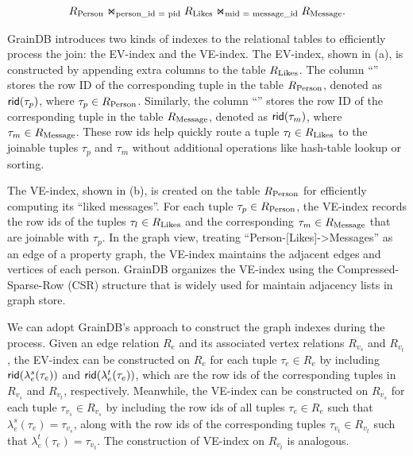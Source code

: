 \[ {R_{\text{Person}}} \Join_\text{person\_id = pid} {\ensuremath R_{\text{Likes}}} \Join_\text{mid = message\_id} {\ensuremath R_{\text{Message}}}. \]

GrainDB introduces two kinds of indexes to the relational tables to efficiently process the join: the EV-index and the VE-index. The EV-index, shown in (a), is constructed by appending extra columns to the table ${R_{\text{Likes}}}$. The column ``'' stores the row ID of the corresponding tuple in the table ${R_{\text{Person}}}$, denoted as ${\mathsf{rid}}(\tau_{p})$, where $\tau_{p} \in {\ensuremath R_{\text{Person}}}$. Similarly, the column ``'' stores the row ID of the corresponding tuple in the table ${R_{\text{Message}}}$, denoted as ${\mathsf{rid}}(\tau_{m})$, where $\tau_{m} \in {\ensuremath R_{\text{Message}}}$. These row ids help quickly route a tuple $\tau_{l} \in {\ensuremath R_{\text{Likes}}}$ to the joinable tuples $\tau_{p}$ and $\tau_{m}$ without additional operations like hash-table lookup or sorting.

The VE-index, shown in (b), is created on the table ${R_{\text{Person}}}$ for efficiently computing its ``liked messages''. For each tuple $\tau_{p} \in {\ensuremath R_{\text{Person}}}$, the VE-index records the row ids of the tuples $\tau_{l} \in {\ensuremath R_{\text{Likes}}}$ and the corresponding $\tau_{m} \in {\ensuremath R_{\text{Message}}}$ that are joinable with $\tau_{p}$. In the graph view, treating ``Person-[Likes]->Messages'' as an edge of a property graph, the VE-index maintains the adjacent edges and vertices of each person. GrainDB organizes the VE-index using the Compressed-Sparse-Row (CSR) structure that is widely used for maintain adjacency lists in graph store.

We can adopt GrainDB's approach to construct the graph indexes during the \rgmapping process. Given an edge relation $R_e$ and its associated vertex relations $R_{v_s}$ and $R_{v_t}$, the EV-index can be constructed on $R_e$ for each tuple $\tau_e \in R_e$ by including ${\mathsf{rid}}(\lambda_e^s(\tau_e))$ and ${\mathsf{rid}}(\lambda_e^t(\tau_e))$, which are the row ids of the corresponding tuples in $R_{v_s}$ and $R_{v_t}$, respectively. Meanwhile, the VE-index can be constructed on $R_{v_s}$ for each tuple $\tau_{v_s} \in R_{v_s}$ by including the row ids of all tuples $\tau_e \in R_e$ such that $\lambda_e^s(\tau_e) = \tau_{v_s}$, along with the row ids of the corresponding tuples $\tau_{v_t} \in R_{v_t}$ such that $\lambda_e^t(\tau_e) = \tau_{v_t}$.
The construction of VE-index on $R_{v_t}$ is analogous.

